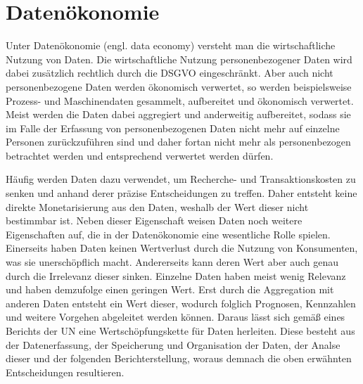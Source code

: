 \section{Datenökonomie} \label{datenoekonomie}
Unter Datenökonomie (engl. data economy) versteht man die wirtschaftliche Nutzung von Daten. Die wirtschaftliche Nutzung personenbezogener Daten wird dabei zusätzlich rechtlich durch die DSGVO eingeschränkt. Aber auch nicht personenbezogene Daten werden ökonomisch verwertet, so werden beispielsweise Prozess- und Maschinendaten gesammelt, aufbereitet und ökonomisch verwertet. \cite{bpb_2019} Meist werden die Daten dabei aggregiert und anderweitig aufbereitet, sodass sie im Falle der Erfassung von personenbezogenen Daten nicht mehr auf einzelne Personen zurückzuführen sind und daher fortan nicht mehr als personenbezogen betrachtet werden und entsprechend verwertet werden dürfen. \newline

\noindent Häufig werden Daten dazu verwendet, um Recherche- und Transaktionskosten zu senken und anhand derer präzise Entscheidungen zu treffen. Daher entsteht keine direkte Monetarisierung aus den Daten, weshalb der Wert dieser nicht bestimmbar ist. Neben dieser Eigenschaft weisen Daten noch weitere Eigenschaften auf, die in der Datenökonomie eine wesentliche Rolle spielen. Einerseits haben Daten keinen Wertverlust durch die Nutzung von Konsumenten, was sie unerschöpflich macht. Andererseits kann deren Wert aber auch genau durch die Irrelevanz dieser sinken. Einzelne Daten haben meist wenig Relevanz und haben demzufolge einen geringen Wert. Erst durch die Aggregation mit anderen Daten entsteht ein Wert dieser, wodurch folglich Prognosen, Kennzahlen und weitere Vorgehen abgeleitet werden können. Daraus lässt sich gemäß eines Berichts der \gls{UN} eine Wertschöpfungskette für Daten herleiten. Diese besteht aus der Datenerfassung, der Speicherung und Organisation der Daten, der Analse dieser und der folgenden Berichterstellung, woraus demnach die oben erwähnten Entscheidungen resultieren. \cite{un_2019} \newline


